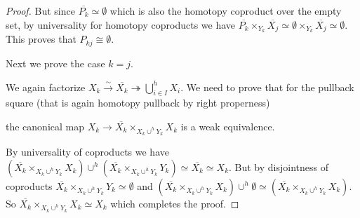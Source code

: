 \begin{corollary}
\begin{proof}
        But since $\overline{P_{k}}\simeq\emptyset$ which is also the homotopy coproduct over the empty set, by universality for homotopy coproducts we have $\overline{P_k}\times_{Y_k}\overline{X_j}\simeq\emptyset\times_{Y_k}\overline{X_j}\simeq\emptyset$.
        This proves that $P_{kj}\cong\emptyset$.

        Next we prove the case $k=j$. 

        We again factorize $X_k\xrightarrow{\sim}\overline{X_k}\twoheadrightarrow\bigcup\limits_{i\in I}^h X_i$.
        We need to prove that for the pullback square (that is again homotopy pullback by right properness)
        \begin{center}
        \end{center}
        the canonical map $X_k\to\overline{X_k}\times_{X_k\cup^h Y_k}X_k$ is a weak equivalence.

        By universality of coproducts we have $\left(\overline{X_k}\times_{X_k\cup^h Y_k}X_k\right)\cup^h\left(\overline{X_k}\times_{X_k\cup^h Y_k}Y_k\right)\simeq \overline{X_k}\simeq X_k$.
        But by disjointness of coproducts $\overline{X_k}\times_{X_k\cup^h Y_k}Y_k\simeq\emptyset$ and $\left(\overline{X_k}\times_{X_k\cup^h Y_k}X_k\right)\cup^h\emptyset\simeq\left(\overline{X_k}\times_{X_k\cup^h Y_k}X_k\right)$.
        So $\overline{X_k}\times_{X_k\cup^h Y_k}X_k\simeq X_k$ which completes the proof.
    \end{proof}
\end{corollary}

